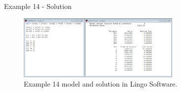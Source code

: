 \begin{frame}{Example 14 - Solution}
\begin{figure}
    \includegraphics[width=300px]{slides/ex14/screenshot.png}
    \caption{Example 14 model and solution in Lingo Software.}
\end{figure}
\end{frame}
